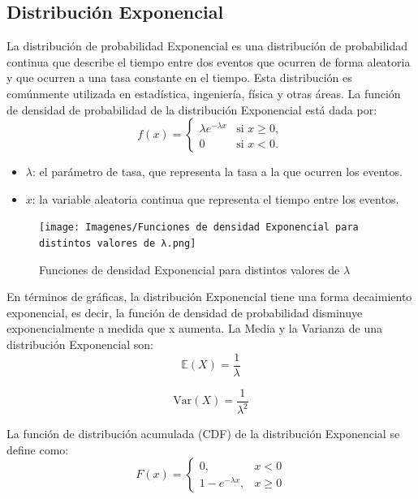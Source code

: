 \documentclass{article}
\begin{document}
\subsection{Distribución Exponencial}
 La distribución de probabilidad Exponencial es una distribución de probabilidad continua que describe el tiempo entre dos eventos que ocurren de forma aleatoria y que ocurren a una tasa constante en el tiempo. Esta distribución es comúnmente utilizada en estadística, ingeniería, física y otras áreas. La función de densidad de probabilidad de la distribución Exponencial está dada por:
\begin{equation}
       f(x) = 
    \begin{cases}
    \lambda e^{-\lambda x} & \text{si } x \geq 0, \\
    0 & \text{si } x < 0.
    \end{cases}
\end{equation}
\begin{itemize}
    \item $\lambda$: el parámetro de tasa, que representa la tasa a la que ocurren los eventos.
    \item $x$: la variable aleatoria continua que representa el tiempo entre los eventos.
\end{itemize}

\begin{figure}[H]
    \centering
    \texttt{[image: Imagenes/Funciones de densidad Exponencial para distintos valores de λ.png]}
    \caption{Funciones de densidad Exponencial para distintos valores de $\lambda$}
    \label{fig:Dist.Exponencial}
\end{figure}
En términos de gráficas, la distribución Exponencial tiene una forma decaimiento exponencial, es decir, la función de densidad de probabilidad disminuye exponencialmente a medida que x aumenta.
La Media y la Varianza de una distribución Exponencial son:
\begin{equation}
    \mathbb{E}(X) = \frac{1}{\lambda}
\end{equation}

\begin{equation}
    \mathrm{Var}(X) = \frac{1}{\lambda^2}
\end{equation}

La función de distribución acumulada (CDF) de la distribución Exponencial se define como:
\begin{equation}
    F(x) = 
    \begin{cases}
    0, & x < 0 \\
    1 - e^{-\lambda x}, & x \geq 0
    \end{cases}
\end{equation}
\end{document}
